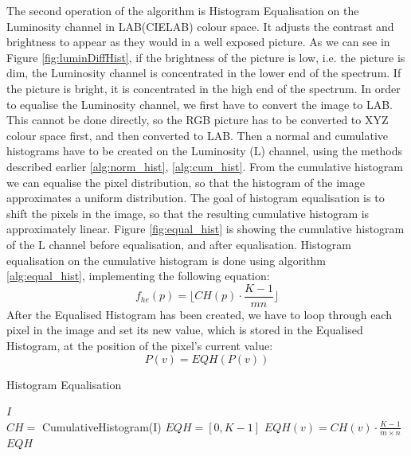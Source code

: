 \documentclass[journal,transmag]{IEEEtran}
\begin{document}
The second operation of the algorithm is Histogram Equalisation on the Luminosity channel in LAB(CIELAB) colour space. It adjusts the contrast and brightness to appear as they would in a well exposed picture. As we can see in Figure \ref{fig:luminDiffHist}, if the brightness of the picture is low, i.e. the picture is dim, the Luminosity channel is concentrated in the lower end of the spectrum. If the picture is bright, it is concentrated in the high end of the spectrum. In order to equalise the Luminosity channel, we first have to convert the image to LAB. This cannot be done directly, so the RGB picture has to be converted to XYZ colour\cite{rgbTOxyz} space first, and then converted to LAB\cite{xyzTOlab}. Then a normal and cumulative histograms have to be created on the Luminosity (L) channel, using the methods described earlier \ref{alg:norm_hist}, \ref{alg:cum_hist}. From the cumulative histogram we can equalise the pixel distribution, so that the histogram of the image approximates a uniform distribution. The goal of histogram equalisation is to shift the pixels in the image, so that the resulting cumulative histogram is approximately linear. \cite{automaticContrast} Figure \ref{fig:equal_hist} is showing the cumulative histogram of the L channel before equalisation, and after equalisation. Histogram equalisation on the cumulative histogram is done using algorithm \ref{alg:equal_hist}, implementing the following equation: 
\begin{equation}
f_{he}(p) = \lfloor CH(p) \cdot \frac{K - 1}{mn}\rfloor
\end{equation}
\noindent After the Equalised Histogram has been created, we have to loop through each pixel in the image and set its new value, which is stored in the Equalised Histogram, at the position of the pixel's current value: 
\begin{equation}\label{eq:histEqPixel}
P(v) = EQH(P(v))
\end{equation}
\begin{algorithm}[h!] %
	\caption{Histogram Equalisation}
	\label{alg:equal_hist}
	\begin{algorithmic}[1]
		 {$I$}\\ 
		\State
		\State $CH =$ CumulativeHistogram(I)
		\State $EQH = [0, K-1]$
		\State
		\State $EQH(v) = CH(v)\cdot\frac{K-1}{m \times n}$
		\EndFor
		\State 
		\State
		\Return $EQH$
		\EndFunction
	\end{algorithmic}
\end{algorithm}
\end{document}
